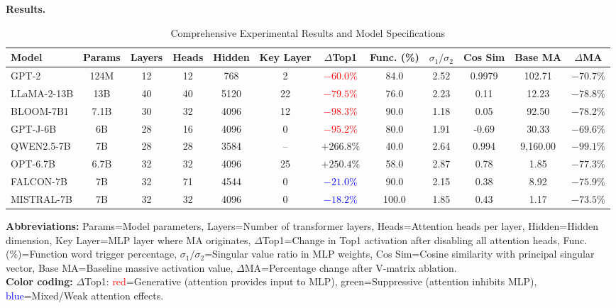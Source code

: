 \documentclass[conference]{IEEEtran}
\begin{document}
\smallskip
\noindent\textbf{Results.}

\begin{table}[htbp]
\centering
\caption{Comprehensive Experimental Results and Model Specifications}
\label{tab:comprehensive_experimental_results}
\footnotesize
\begin{tabular}{@{}lccccccccccc@{}}
\toprule
\textbf{Model} & \textbf{Params} & \textbf{Layers} & \textbf{Heads} & \textbf{Hidden} & \textbf{Key Layer} & \textbf{$\Delta$Top1} & \textbf{Func. (\%)} & \textbf{$\sigma_1/\sigma_2$} & \textbf{Cos Sim} & \textbf{Base MA} & \textbf{$\Delta$MA} \\
\midrule
GPT-2 & 124M & 12 & 12 & 768 & 2 & \textcolor{red}{$-60.0\%$} & 84.0 & 2.52 & 0.9979 & 102.71 & $-70.7\%$ \\
LLaMA-2-13B & 13B & 40 & 40 & 5120 & 22 & \textcolor{red}{$-79.5\%$} & 76.0 & 2.23 & 0.11 & 12.23 & $-78.8\%$ \\
BLOOM-7B1 & 7.1B & 30 & 32 & 4096 & 12 & \textcolor{red}{$-98.3\%$} & 90.0 & 1.18 & 0.05 & 92.50 & $-78.2\%$ \\
GPT-J-6B & 6B & 28 & 16 & 4096 & 0 & \textcolor{red}{$-95.2\%$} & 80.0 & 1.91 & -0.69 & 30.33 & $-69.6\%$ \\
\midrule
QWEN2.5-7B & 7B & 28 & 28 & 3584 & -- & \textcolor{green!60!black}{$+266.8\%$} & 40.0 & 2.64 & 0.994 & 9,160.00 & $-99.1\%$ \\
OPT-6.7B & 6.7B & 32 & 32 & 4096 & 25 & \textcolor{green!60!black}{$+250.4\%$} & 58.0 & 2.87 & 0.78 & 1.85 & $-77.3\%$ \\
\midrule
FALCON-7B & 7B & 32 & 71 & 4544 & 0 & \textcolor{blue}{$-21.0\%$} & 90.0 & 2.15 & 0.38 & 8.92 & $-75.9\%$ \\
MISTRAL-7B & 7B & 32 & 32 & 4096 & 0 & \textcolor{blue}{$-18.2\%$} & 100.0 & 1.85 & 0.43 & 1.17 & $-73.5\%$ \\
\bottomrule
\end{tabular}
\vspace{2mm}
\parbox{\linewidth}{\scriptsize
\textbf{Abbreviations:} Params=Model parameters, Layers=Number of transformer layers, Heads=Attention heads per layer, Hidden=Hidden dimension, Key Layer=MLP layer where MA originates, $\Delta$Top1=Change in Top1 activation after disabling all attention heads, Func. (\%)=Function word trigger percentage, $\sigma_1/\sigma_2$=Singular value ratio in MLP weights, Cos Sim=Cosine similarity with principal singular vector, Base MA=Baseline massive activation value, $\Delta$MA=Percentage change after V-matrix ablation. \\
\textbf{Color coding:} $\Delta$Top1: \textcolor{red}{red}=Generative (attention provides input to MLP), \textcolor{green!60!black}{green}=Suppressive (attention inhibits MLP), \textcolor{blue}{blue}=Mixed/Weak attention effects.}
\end{table}
\end{document}
